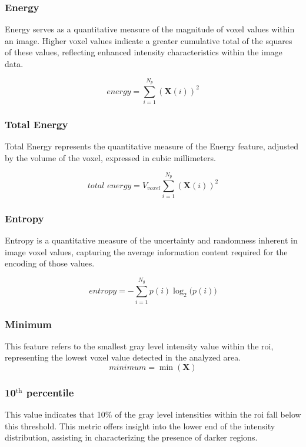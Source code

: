 \subsubsection*{Energy}
Energy serves as a quantitative measure of the magnitude of voxel values within an image. Higher voxel values indicate a greater cumulative total of the squares of these values, reflecting enhanced intensity characteristics within the image data.

\begin{equation}
    \textit{energy} = \displaystyle\sum^{N_p}_{i=1}{(\textbf{X}(i))^2}
\end{equation}

\subsubsection*{Total Energy}
Total Energy represents the quantitative measure of the Energy feature, adjusted by the volume of the voxel, expressed in cubic millimeters.

\begin{equation}
    \textit{total energy} = V_{voxel}\displaystyle\sum^{N_p}_{i=1}{(\textbf{X}(i))^2}
\end{equation}

\subsubsection*{Entropy}
Entropy is a quantitative measure of the uncertainty and randomness inherent in image voxel values, capturing the average information content required for the encoding of those values.

\begin{equation}
    \textit{entropy} = -\displaystyle\sum^{N_g}_{i=1}{p(i)\log_2\big(p(i)\big)}
\end{equation}

\subsubsection*{Minimum}
This feature refers to the smallest gray level intensity value within the \ac{roi}, representing the lowest voxel value detected in the analyzed area.  
\begin{equation}
    \textit{minimum} = \min(\textbf{X})
\end{equation}

\subsubsection*{10$^{\text{th}}$ percentile}
This value indicates that 10\% of the gray level intensities within the \ac{roi} fall below this threshold.
This metric offers insight into the lower end of the intensity distribution, assisting in characterizing the presence of darker regions. 

